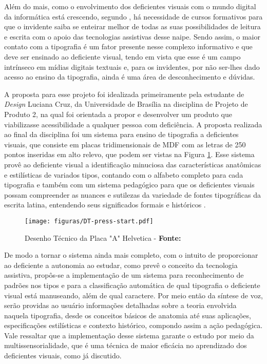 Além do mais, como o envolvimento dos deficientes visuais com o mundo digital da informática está crescendo, segundo , há necessidade de cursos formativos para que o invidente saiba se enteirar melhor de todas as suas possibilidades de leitura e escrita com o apoio das tecnologias assistivas desse naipe. Sendo assim, o maior contato com a tipografia é um fator presente nesse complexo informativo e que deve ser ensinado ao deficiente visual, tendo em vista que esse é um campo intrínseco em mídias digitais textuais e, para os invidentes, por não ser-lhes dado acesso ao ensino da tipografia, ainda é uma área de desconhecimento e dúvidas.

A proposta para esse projeto foi idealizada primeiramente pela estudante de \textit{Design} Luciana Cruz, da Universidade de Brasília  na disciplina de Projeto de Produto 2, na qual foi orientada a propor e desenvolver um produto que viabilizasse acessibilidade a qualquer pessoa com deficiência. A proposta realizada ao final da disciplina foi um sistema para ensino de tipografia a deficientes visuais, que consiste em placas tridimensionais de MDF com as letras de 250 pontos inseridas em alto relevo, que podem ser vistas na Figura \ref{fig:dt}. Esse sistema provê ao deficiente visual a identificação minuciosa das características anatômicas e estilísticas de variados tipos, contando com o alfabeto completo para cada tipografia e também com um sistema pedagógico para que os deficientes visuais possam compreender as nuances e sutilezas da variedade de fontes tipográficas da escrita latina, entendendo seus significados formais e históricos .



\begin{figure}[H]
  \centering
  \texttt{[image: figuras/DT-press-start.pdf]}
  \caption{Desenho Técnico da Placa "A" Helvetica - \textbf{Fonte:} }
  \label{fig:dt}
\end{figure}

De modo a tornar o sistema ainda mais completo, com o intuito de proporcionar ao deficiente a autonomia ao estudar, como prevê o conceito da tecnologia assistiva, propôs-se a implementação de um sistema para reconhecimento de padrões nos tipos e para a classificação automática de qual tipografia o deficiente visual está manuseando, além de qual caractere. Por meio então da síntese de voz, serão providas ao usuário informações detalhadas sobre a teoria envolvida naquela tipografia, desde os conceitos básicos de anatomia até suas aplicações, especificações estilísticas e contexto histórico, compondo assim a ação pedagógica. Vale ressaltar que a implementação desse sistema garante o estudo por meio da multissensorialidade, que é uma técnica de maior eficácia no aprendizado dos deficientes visuais, como já discutido.

